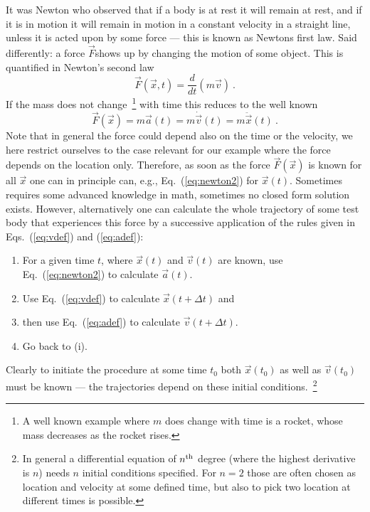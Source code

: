 \documentclass[12pt]{iopart}
\begin{document}
It was Newton who observed that if a body is at rest it will remain at rest, and if it is in motion it will remain in motion in a 
constant velocity in a straight line, unless it is acted upon by some force --- this is known as Newtons first law. 
Said differently: a force $\vec F$shows up by changing the motion of some object. This is quantified in Newton's second law
\begin{equation}
\vec F(\vec x, t) = \frac{d}{dt}(m \vec v) \ .
\end{equation} 
If the mass does not change~\footnote{A well known example where $m$ does change with time is a 
rocket, whose mass decreases as the rocket rises.} with time this reduces to the well known
\begin{equation}
\vec F(\vec x) = m \vec a(t) = m\dot{\vec v}(t) = m\ddot{\vec{x}}(t) \ . \label{eq:newton2}
\end{equation} 
Note that in general the force could depend also on the time or the velocity, we here restrict ourselves to the
case relevant for our example where the force depends on the location only. 
Therefore, 
as soon as the force $\vec F(\vec x)$ is known for all $\vec x$ one can in principle can, e.g., Eq.~(\ref{eq:newton2})
for $\vec x(t)$.
Sometimes requires some advanced knowledge in math, sometimes no closed form solution exists. However, alternatively 
one can calculate the whole trajectory
of some test body that experiences this force by a successive application of the rules 
given in Eqs.~(\ref{eq:vdef}) and (\ref{eq:adef}):
\begin{enumerate}
\item For a given time $t$, where $\vec x(t)$ and $\vec v(t)$ are known, use Eq.~(\ref{eq:newton2}) to calculate $\vec a(t)$.
\item Use Eq.~(\ref{eq:vdef}) to calculate $\vec x(t+\Delta t)$ and
\item then use Eq.~(\ref{eq:adef}) to calculate $\vec v(t+\Delta t)$.
\item Go back to (i).
\end{enumerate}
Clearly to initiate the procedure at some time $t_0$ both $\vec x(t_0)$ as well as $\vec v(t_0)$ must be known --- the 
trajectories depend on these initial conditions.~\footnote{In general a differential equation of $n^{\rm th}$ degree (where
the highest derivative is $n$) needs $n$ initial conditions specified. For $n=2$ those are often chosen as location and velocity
at some defined time, but also to pick two location at different times is possible. }
\end{document}
